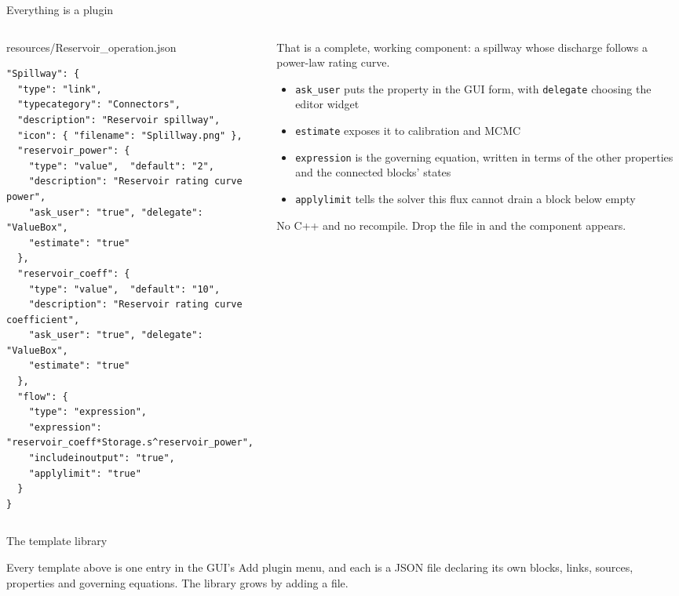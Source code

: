 \documentclass[aspectratio=169, 10pt]{beamer}
\begin{document}
\begin{frame}[fragile]{Everything is a plugin}
  \begin{columns}[T,onlytextwidth]
    \begin{column}{0.53\textwidth}
      {\tiny\color{ohqgrey}\ttfamily resources/Reservoir\_operation.json}
      \vspace{-1pt}
\begin{lstlisting}[style=ohqjsonstyle]
"Spillway": {
  "type": "link",
  "typecategory": "Connectors",
  "description": "Reservoir spillway",
  "icon": { "filename": "Splillway.png" },
  "reservoir_power": {
    "type": "value",  "default": "2",
    "description": "Reservoir rating curve power",
    "ask_user": "true", "delegate": "ValueBox",
    "estimate": "true"
  },
  "reservoir_coeff": {
    "type": "value",  "default": "10",
    "description": "Reservoir rating curve coefficient",
    "ask_user": "true", "delegate": "ValueBox",
    "estimate": "true"
  },
  "flow": {
    "type": "expression",
    "expression": "reservoir_coeff*Storage.s^reservoir_power",
    "includeinoutput": "true",
    "applylimit": "true"
  }
}
\end{lstlisting}
    \end{column}
    \begin{column}{0.44\textwidth}
      That is a complete, working component: a spillway whose discharge follows
      a power-law rating curve.
      \begin{itemize}\setlength\itemsep{2pt}
        \item \texttt{ask\_user} puts the property in the GUI form, with
              \texttt{delegate} choosing the editor widget
        \item \texttt{estimate} exposes it to calibration and MCMC
        \item \texttt{expression} is the governing equation, written in terms
              of the other properties and the connected blocks' states
        \item \texttt{applylimit} tells the solver this flux cannot drain a
              block below empty
      \end{itemize}
      No C++ and no recompile. Drop the file in and the component appears.
    \end{column}
  \end{columns}
\end{frame}

\begin{frame}{The template library}
  \vspace{-0.3em}
  
  \vspace{0.1em}
  {\scriptsize Every template above is one entry in the GUI's \alert{Add plugin}
  menu, and each is a JSON file declaring its own blocks, links, sources,
  properties and governing equations. The library grows by adding a file.}
\end{frame}
\end{document}
